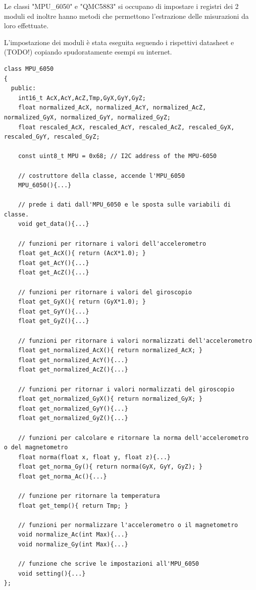 \documentclass[10pt,a4paper]{article}
\begin{document}
Le classi "MPU\_6050" e "QMC5883" si occupano di impostare i registri dei 2 moduli ed inoltre hanno metodi che permettono l'estrazione delle misurazioni da loro effettuate. 

L'impostazione dei moduli \`e stata eseguita seguendo i rispettivi datasheet e (TODO!) copiando spudoratamente esempi su internet. 
\begin{lstlisting}[style=myArduino, caption=classe "MPU\_6050", captionpos=b]
class MPU_6050
{
  public:
    int16_t AcX,AcY,AcZ,Tmp,GyX,GyY,GyZ;
    float normalized_AcX, normalized_AcY, normalized_AcZ, normalized_GyX, normalized_GyY, normalized_GyZ;
    float rescaled_AcX, rescaled_AcY, rescaled_AcZ, rescaled_GyX, rescaled_GyY, rescaled_GyZ;
  
    const uint8_t MPU = 0x68; // I2C address of the MPU-6050
    
    // costruttore della classe, accende l'MPU_6050
    MPU_6050(){...}
  
    // prede i dati dall'MPU_6050 e le sposta sulle variabili di classe.
    void get_data(){...}
  
    // funzioni per ritornare i valori dell'accelerometro
    float get_AcX(){ return (AcX*1.0); }
    float get_AcY(){...}
    float get_AcZ(){...}
  
    // funzioni per ritornare i valori del giroscopio
    float get_GyX(){ return (GyX*1.0); }
    float get_GyY(){...}
    float get_GyZ(){...}
    
    // funzioni per ritornare i valori normalizzati dell'accelerometro
    float get_normalized_AcX(){ return normalized_AcX; }
    float get_normalized_AcY(){...}
    float get_normalized_AcZ(){...}
  
    // funzioni per ritornar i valori normalizzati del giroscopio
    float get_normalized_GyX(){ return normalized_GyX; }
    float get_normalized_GyY(){...}
    float get_normalized_GyZ(){...}
  
    // funzioni per calcolare e ritornare la norma dell'accelerometro o del magnetometro
    float norma(float x, float y, float z){...}
    float get_norma_Gy(){ return norma(GyX, GyY, GyZ); }
    float get_norma_Ac(){...}
  
    // funzione per ritornare la temperatura
    float get_temp(){ return Tmp; }
  
    // funzioni per normalizzare l'accelerometro o il magnetometro
    void normalize_Ac(int Max){...}
    void normalize_Gy(int Max){...}
    
    // funzione che scrive le impostazioni all'MPU_6050
    void setting(){...}
};
\end{lstlisting}
\end{document}
